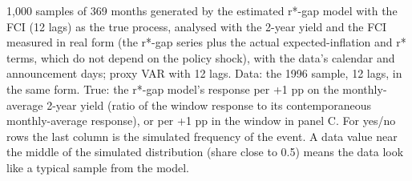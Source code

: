 \begin{table}[p]
\par\smallskip\parbox{0.95\linewidth}{\scriptsize 1,000 samples of 369 months generated by the estimated r*-gap model with the FCI (12 lags) as the true process, analysed with the 2-year yield and the FCI measured in real form (the r*-gap series plus the actual expected-inflation and r* terms, which do not depend on the policy shock), with the data's calendar and announcement days; proxy VAR with 12 lags. Data: the 1996 sample, 12 lags, in the same form. True: the r*-gap model's response per +1 pp on the monthly-average 2-year yield (ratio of the window response to its contemporaneous monthly-average response), or per +1 pp in the window in panel C. For yes/no rows the last column is the simulated frequency of the event. A data value near the middle of the simulated distribution (share close to 0.5) means the data look like a typical sample from the model.}
\end{table}
